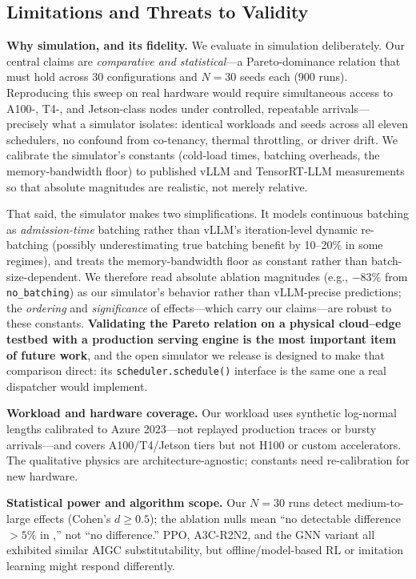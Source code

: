 \subsection{Limitations and Threats to Validity}
\label{sec:limitations}

\textbf{Why simulation, and its fidelity.} We evaluate in
simulation deliberately. Our central claims are
\emph{comparative and statistical}---a Pareto-dominance
relation that must hold across 30 configurations and
$N{=}30$ seeds each (900 runs). Reproducing this sweep on
real hardware would require simultaneous access to A100-,
T4-, and Jetson-class nodes under controlled, repeatable
arrivals---precisely what a simulator isolates: identical
workloads and seeds across all eleven schedulers, no confound
from co-tenancy, thermal throttling, or driver drift. We calibrate the
simulator's constants (cold-load times, batching overheads,
the memory-bandwidth floor) to published vLLM and
TensorRT-LLM measurements so that absolute magnitudes are
realistic, not merely relative.

That said, the simulator makes two simplifications. It models
continuous batching as \emph{admission-time} batching rather
than vLLM's iteration-level dynamic re-batching (possibly
underestimating true batching benefit by 10--20\% in some
regimes), and treats the memory-bandwidth floor as constant
rather than batch-size-dependent. We therefore read absolute
ablation magnitudes (e.g., $-83\%$ from \texttt{no\_batching})
as our simulator's behavior rather than vLLM-precise
predictions; the \emph{ordering} and \emph{significance} of
effects---which carry our claims---are robust to these
constants. \textbf{Validating the Pareto relation on a
physical cloud--edge testbed with a production serving engine
is the most important item of future work}, and the open
simulator we release is designed to make that comparison
direct: its \texttt{scheduler.schedule()} interface is the
same one a real dispatcher would implement.

\textbf{Workload and hardware coverage.} Our workload uses
synthetic log-normal lengths calibrated to Azure 2023---not
replayed production traces or bursty arrivals---and covers
A100/T4/Jetson tiers but not H100 or custom accelerators. The
qualitative physics are architecture-agnostic; constants need
re-calibration for new hardware.

\textbf{Statistical power and algorithm scope.} Our $N=30$
runs detect medium-to-large effects (Cohen's $d \ge 0.5$);
the ablation nulls mean
``no detectable difference $>5\%$ in \slo,'' not ``no
difference.'' PPO, A3C-R2N2, and the GNN variant all
exhibited similar AIGC substitutability, but
offline/model-based RL or imitation learning might respond
differently.

